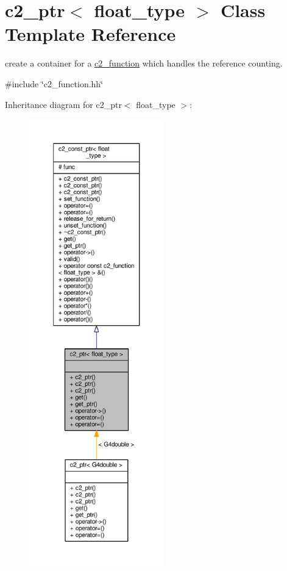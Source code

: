 \hypertarget{classc2__ptr}{}\section{c2\+\_\+ptr$<$ float\+\_\+type $>$ Class Template Reference}
\label{classc2__ptr}


create a container for a \hyperlink{classc2__function}{c2\+\_\+function} which handles the reference counting.  




{\ttfamily \#include \char`\"{}c2\+\_\+function.\+hh\char`\"{}}



Inheritance diagram for c2\+\_\+ptr$<$ float\+\_\+type $>$\+:
\nopagebreak
\begin{figure}[H]
\begin{center}
\leavevmode
\includegraphics[height=550pt]{classc2__ptr__inherit__graph}
\end{center}
\end{figure}


